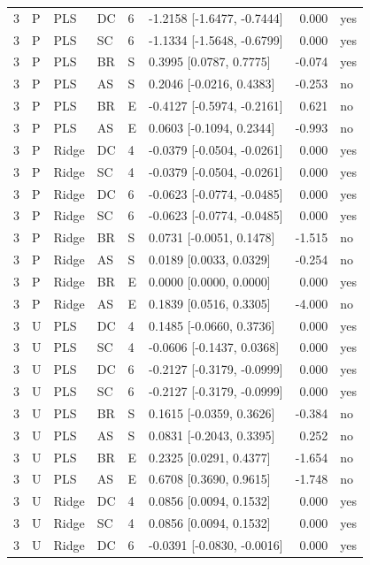 \documentclass[10pt,a4paper]{article}
\begin{document}
\begin{landscape}
\begin{longtable}{rlllllrl}
3 & P & PLS & DC & 6 & -1.2158 [-1.6477, -0.7444] & 0.000 & yes \\
3 & P & PLS & SC & 6 & -1.1334 [-1.5648, -0.6799] & 0.000 & yes \\
3 & P & PLS & BR & S & 0.3995 [0.0787, 0.7775] & -0.074 & yes \\
3 & P & PLS & AS & S & 0.2046 [-0.0216, 0.4383] & -0.253 & no \\
3 & P & PLS & BR & E & -0.4127 [-0.5974, -0.2161] & 0.621 & no \\
3 & P & PLS & AS & E & 0.0603 [-0.1094, 0.2344] & -0.993 & no \\
3 & P & Ridge & DC & 4 & -0.0379 [-0.0504, -0.0261] & 0.000 & yes \\
3 & P & Ridge & SC & 4 & -0.0379 [-0.0504, -0.0261] & 0.000 & yes \\
3 & P & Ridge & DC & 6 & -0.0623 [-0.0774, -0.0485] & 0.000 & yes \\
3 & P & Ridge & SC & 6 & -0.0623 [-0.0774, -0.0485] & 0.000 & yes \\
3 & P & Ridge & BR & S & 0.0731 [-0.0051, 0.1478] & -1.515 & no \\
3 & P & Ridge & AS & S & 0.0189 [0.0033, 0.0329] & -0.254 & no \\
3 & P & Ridge & BR & E & 0.0000 [0.0000, 0.0000] & 0.000 & yes \\
3 & P & Ridge & AS & E & 0.1839 [0.0516, 0.3305] & -4.000 & no \\
3 & U & PLS & DC & 4 & 0.1485 [-0.0660, 0.3736] & 0.000 & yes \\
3 & U & PLS & SC & 4 & -0.0606 [-0.1437, 0.0368] & 0.000 & yes \\
3 & U & PLS & DC & 6 & -0.2127 [-0.3179, -0.0999] & 0.000 & yes \\
3 & U & PLS & SC & 6 & -0.2127 [-0.3179, -0.0999] & 0.000 & yes \\
3 & U & PLS & BR & S & 0.1615 [-0.0359, 0.3626] & -0.384 & no \\
3 & U & PLS & AS & S & 0.0831 [-0.2043, 0.3395] & 0.252 & no \\
3 & U & PLS & BR & E & 0.2325 [0.0291, 0.4377] & -1.654 & no \\
3 & U & PLS & AS & E & 0.6708 [0.3690, 0.9615] & -1.748 & no \\
3 & U & Ridge & DC & 4 & 0.0856 [0.0094, 0.1532] & 0.000 & yes \\
3 & U & Ridge & SC & 4 & 0.0856 [0.0094, 0.1532] & 0.000 & yes \\
3 & U & Ridge & DC & 6 & -0.0391 [-0.0830, -0.0016] & 0.000 & yes \\

\end{longtable}
\end{landscape}
\end{document}
